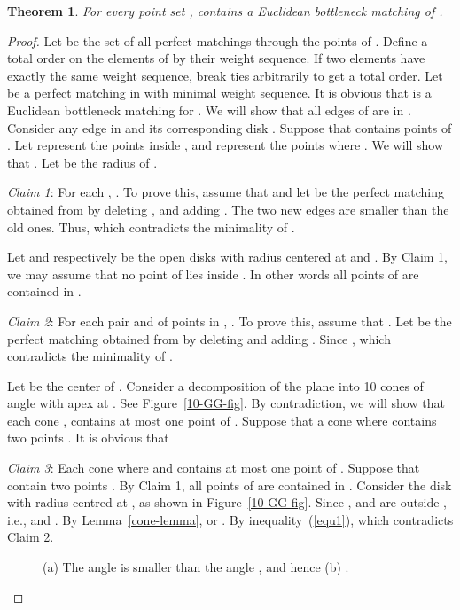 \documentclass[11pt,a4paper]{article}
\newcommand{\kGG}[2]{}
\newtheorem{theorem}{Theorem}
\begin{document}
\begin{theorem}
 \label{10-GG-thr}
For every point set , \kGG{10}{} contains a Euclidean bottleneck matching of .
\end{theorem}
\begin{proof}
Let  be the set of all perfect matchings through the points of . Define a total order on the elements of  by their weight sequence. If two elements have exactly the same weight sequence, break ties arbitrarily to get a total order.
Let  be a perfect matching in  with minimal weight sequence. It is obvious that  is a Euclidean bottleneck matching for . We will show that all edges of  are in \kGG{10}{}. Consider any edge  in  and its corresponding disk . Suppose that  contains  points of . Let  represent the points inside , and  represent the points where . We will show that . Let  be the radius of . 

{\em Claim 1}: For each , . To prove this, assume that  and let  be the perfect matching obtained from  by deleting , and adding . The two new edges are smaller than the old ones. Thus,  which contradicts the minimality of .

Let  and  respectively be the open disks with radius  centered at  and . By Claim 1, we may assume that no point of  lies inside . In other words all points of  are contained in .

{\em Claim 2}: For each pair  and  of points in , . To prove this, assume that . Let  be the perfect matching obtained from  by deleting  and adding . Since ,  which contradicts the minimality of .

Let  be the center of . Consider a decomposition of the plane into 10 cones  of angle  with apex at . See Figure~\ref{10-GG-fig}. By contradiction, we will show that each cone , contains at most one point of . Suppose that a cone  where  contains two points . It is obvious that 




{\em Claim 3}: Each cone  where  and  contains at most one point of . Suppose that  contain two points . By Claim 1, all points of  are contained in . Consider the disk  with radius  centred at , as shown in Figure~\ref{10-GG-fig}. Since ,  and  are outside , i.e.,  and . By Lemma~\ref{cone-lemma},  or . By inequality~(\ref{equ1}),  which contradicts Claim 2.

\begin{figure}[htb]
  \centering
\setlength{\tabcolsep}{0in}
  
  \caption{(a) The angle  is smaller than the angle , and hence (b) .}
\label{cone-fig}
\end{figure}


\end{proof}
\end{document}
